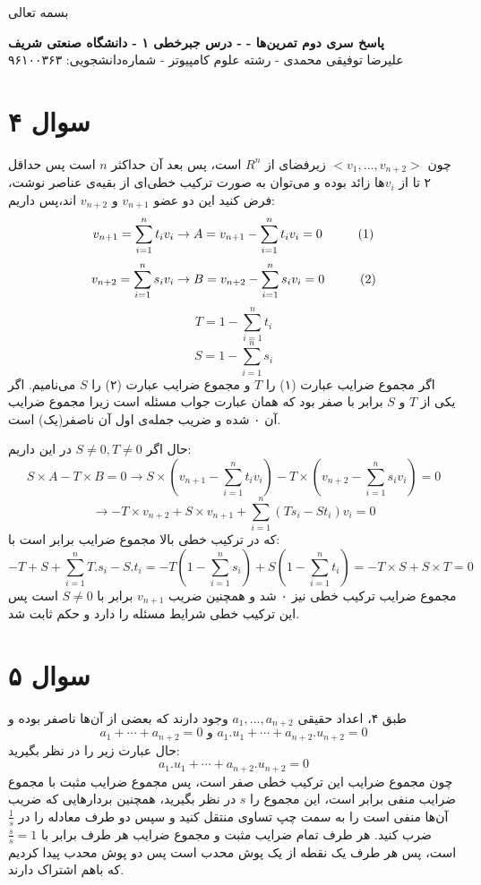 \documentclass[12pt,a4paper]{article}
\begin{document}
\begin{center}
	بسمه تعالی
\end{center}
\begin{center}
	\textbf{
		پاسخ سری دوم تمرین‌ها
		-
		- درس جبرخطی ۱ - دانشگاه صنعتی شریف}
	\\
	علیرضا توفیقی محمدی - رشته علوم کامپیوتر - شماره‌دانشجویی: ۹۶۱۰۰۳۶۳
\end{center}
\section{سوال ۴}
چون 
$<v_1, ..., v_{n+2}>$
زیرفضای از $R^n$ است، پس بعد آن حداکثر $n$ است پس حداقل ۲ تا از $v_i$ها زائد بوده و می‌توان به صورت ترکیب خطی‌ای از بقیه‌ی عناصر نوشت، فرض کنید این دو عضو 
$v_{n+1}$
 و 
$v_{n+2}$
اند،پس داریم:
\[
v_{n+1} = \sum_{i=1}^n t_i v_i
\rightarrow A = v_{n+1} - \sum_{i=1}^n t_i v_i = 0 \hspace*{1cm} (1)
\]
\[
v_{n+2} = \sum_{i=1}^n s_i v_i
\rightarrow B = v_{n+2} - \sum_{i=1}^n s_i v_i = 0 
\hspace*{1cm}(2)
\]
\[
T = 1-\sum_{i=1}^{n}t_i
\]
\[
S = 1-\sum_{i=1}^{n}s_i
\]
اگر مجموع ضرایب عبارت (۱) را $T$ و مجموع ضرایب عبارت (۲) را $S$ می‌نامیم. اگر یکی از $T$ و $S$ برابر با صفر بود که همان عبارت جواب مسئله است زیرا مجموع ضرایب آن ۰ شده و ضریب جمله‌ی اول آن ناصفر(یک) است.

حال اگر 
$S \neq 0, T \neq 0$
در این داریم:
\[
S\times A - T \times B = 0 \rightarrow
S\times (v_{n+1} - \sum_{i=1}^n t_i v_i)
- T \times (v_{n+2} - \sum_{i=1}^n s_i v_i) = 0
\]
\[
\rightarrow -T\times v_{n+2} + S\times v_{n+1} 
+ \sum_{i=1}^n (T s_i - S t_i) v_i = 0
\]
که در ترکیب خطی بالا مجموع ضرایب برابر است با:
\[
-T + S + \sum_{i=1}^n T.s_i - S.t_i =
-T (1- \sum_{i=1}^n s_i) + S (1 - \sum_{i=1}^n t_i)
= -T\times S + S \times T = 0
\]
مجموع ضرایب ترکیب خطی نیز ۰ شد و همچنین ضریب $v_{n+1}$ برابر با $S \neq 0$ است پس این ترکیب خطی شرایط مسئله را دارد و حکم ثابت شد.

\section{سوال ۵}
طبق ۴، اعداد حقیقی 
$a_1, ..., a_{n+2}$
وجود دارند که بعضی از آن‌ها ناصفر بوده و 
\[
a_1 + \cdots + a_{n+2} = 0 \text{  و  }
a_1.u_1 + \cdots + a_{n+2}.u_{n+2} = 0
\]
حال عبارت زیر را در نظر بگیرید:
\[
a_1.u_1 + \cdots + a_{n+2}.u_{n+2} = 0
\]
چون مجموع ضرایب این ترکیب‌ خطی صفر است، پس مجموع ضرایب مثبت با مجموع ضرایب منفی برابر است، این مجموع را $s$ در نظر بگیرید، همچنین بردار‌هایی که ضریب آن‌ها منفی است را به سمت چپ تساوی منتقل کنید و سپس دو طرف معادله را در 
$\frac{1}{s}$
ضرب کنید. هر طرف تمام ضرایب مثبت و مجموع ضرایب هر طرف برابر با 
$\frac{s}{s} = 1$
است، پس هر طرف یک نقطه از یک پوش محدب است پس دو پوش محدب  پیدا کردیم که باهم اشتراک دارند.
\end{document}
